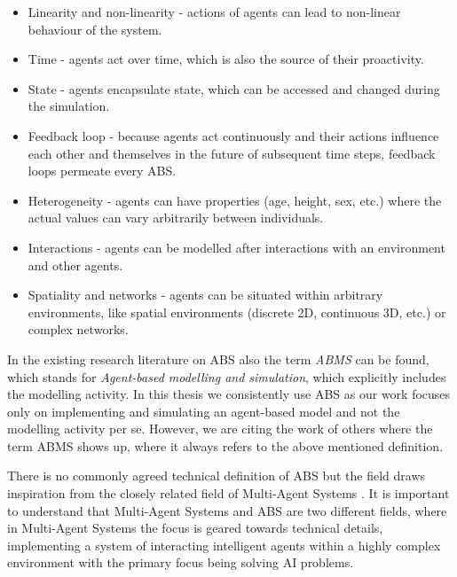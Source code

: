 \begin{itemize}
	\item Linearity and non-linearity - actions of agents can lead to non-linear behaviour of the system.
	\item Time - agents act over time, which is also the source of their proactivity.
	\item State - agents encapsulate state, which can be accessed and changed during the simulation.
	\item Feedback loop - because agents act continuously and their actions influence each other and themselves in the future of subsequent time steps, feedback loops permeate every ABS. 
	\item Heterogeneity - agents can have properties (age, height, sex, etc.) where the actual values can vary arbitrarily between individuals.
	\item Interactions - agents can be modelled after interactions with an environment and other agents.
	\item Spatiality and networks - agents can be situated within arbitrary environments, like spatial environments (discrete 2D, continuous 3D, etc.) or complex networks.
\end{itemize}

In the existing research literature on ABS also the term \textit{ABMS} can be found, which stands for \textit{Agent-based modelling and simulation}, which explicitly includes the modelling activity. In this thesis we consistently use ABS as our work focuses only on implementing and simulating an agent-based model and not the modelling activity per se. However, we are citing the work of others where the term ABMS shows up, where it always refers to the above mentioned definition.

There is no commonly agreed technical definition of ABS but the field draws inspiration from the closely related field of Multi-Agent Systems \cite{weiss_multiagent_2013,wooldridge_introduction_2009}. It is important to understand that Multi-Agent Systems and ABS are two different fields, where in Multi-Agent Systems the focus is geared towards technical details, implementing a system of interacting intelligent agents within a highly complex environment with the primary focus being solving AI problems.

\medskip

